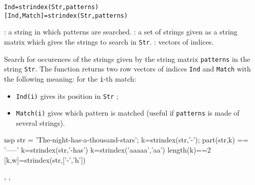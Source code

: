 
\begin{mandesc}
\end{mandesc}
\begin{calling_sequence}
\begin{verbatim}
Ind=strindex(Str,patterns)
[Ind,Match]=strindex(Str,patterns)
\end{verbatim}
\end{calling_sequence}

\begin{parameters}
  \begin{varlist}
    : a string in which patterns are searched.
    : a set of strings given as a string matrix which gives the 
    strings to search in \verb!Str!.
    : vectors of indices.
  \end{varlist}
\end{parameters}

\begin{mandescription}
Search for occurences of the strings given by the string matrix \verb!patterns! 
in the string \verb!Str!. The function returns two row vectors of indices \verb!Ind!
and  \verb!Match! with the following meaning: for the  \verb+i+-th match:
\begin{itemize}
\item \verb+Ind(i)+ gives its position in \verb!Str! ;
\item \verb+Match(i)+ gives which pattern is matched (useful if \verb+patterns+ is made of several strings).
\end{itemize}
\end{mandescription}
\begin{examples}
  \begin{mintednsp}{nsp}
    str = 'The-night-has-a-thousand-stars';
    k=strindex(str,'-');
    part(str,k) == '-----' 
    k=strindex(str,'-has') 
    k=strindex('aaaaa','aa')
    length(k)==2 
    [k,w]=strindex(str,['-','h'])
  \end{mintednsp}
\end{examples}
\begin{manseealso}
  , ,    
\end{manseealso}
